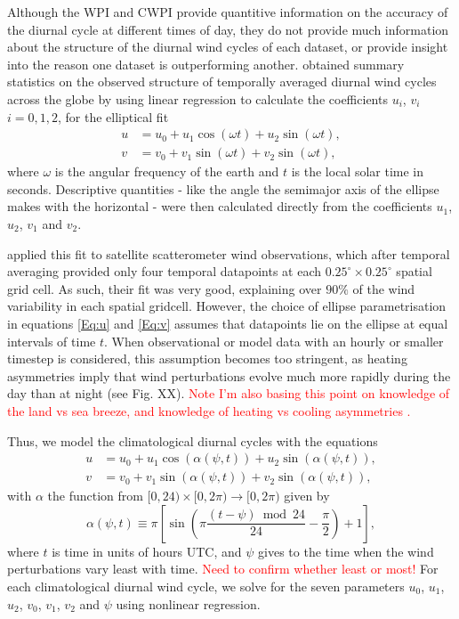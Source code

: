 \documentclass{ametsoc}
\begin{document}
Although the WPI and CWPI provide quantitive information on the accuracy of the diurnal cycle at different times of day, they do not provide much information about the structure of the diurnal wind cycles of each dataset, or provide insight into the reason one dataset is outperforming another. \citet{gille05} obtained summary statistics on the observed structure of temporally averaged diurnal wind cycles across the globe by using linear regression to calculate the coefficients $u_i$, $v_i$ $i=0,1,2$, for the elliptical fit 
\begin{align}
u &= u_0 + u_1 \cos(\omega t) + u_2 \sin(\omega t), \label{Eq:u_h} \\
v &= v_0 + v_1 \sin(\omega t) + v_2 \sin(\omega t), \label{Eq:v_h}
\end{align}
where $\omega$ is the angular frequency of the earth and $t$ is the local solar time in seconds. Descriptive quantities - like the angle the semimajor axis of the ellipse makes with the horizontal - were then calculated directly from the coefficients $u_1$, $u_2$, $v_1$ and $v_2$. 

\citet{gille05} applied this fit to satellite scatterometer wind observations, which after temporal averaging provided only four temporal datapoints at each $0.25^\circ \times 0.25^\circ$ spatial grid cell. As such, their fit was very good, explaining over $90\%$ of the wind variability in each spatial gridcell. However, the choice of ellipse parametrisation in equations \ref{Eq:u} and \ref{Eq:v} assumes that datapoints lie on the ellipse at equal intervals of time $t$. When observational or model data with an hourly or smaller timestep is considered, this assumption becomes too stringent, as heating asymmetries imply that wind perturbations evolve much more rapidly during the day than at night (see Fig. XX). \textcolor{red}{Note I'm also basing this point on knowledge of the land vs sea breeze, and knowledge of heating vs cooling asymmetries \citep[][e.g.]{brown17}.} 

Thus, we model the climatological diurnal cycles with the equations  
\begin{align}
u &= u_0 + u_1 \cos(\alpha(\psi,t)) + u_2 \sin(\alpha(\psi,t)), \label{Eq:u} \\
v &= v_0 + v_1 \sin(\alpha(\psi,t)) + v_2 \sin(\alpha(\psi,t)), \label{Eq:v}
\end{align}
with $\alpha$ the function from $[0,24) \times [0, 2\pi) \to [0, 2\pi)$ given by
\begin{equation}
\alpha(\psi,t) \equiv \pi \left[\sin\left( \pi \frac{(t - \psi)  \bmod 24}{24} - \frac{\pi}{2} \right) + 1 \right], \label{Eq:alpha}
\end{equation}
where $t$ is time in units of hours UTC, and $\psi$ gives to the time when the wind perturbations vary least with time. \textcolor{red}{Need to confirm whether least or most!} For each climatological diurnal wind cycle, we solve for the seven parameters $u_0$, $u_1$, $u_2$, $v_0$, $v_1$, $v_2$ and $\psi$ using nonlinear regression.
\end{document}
